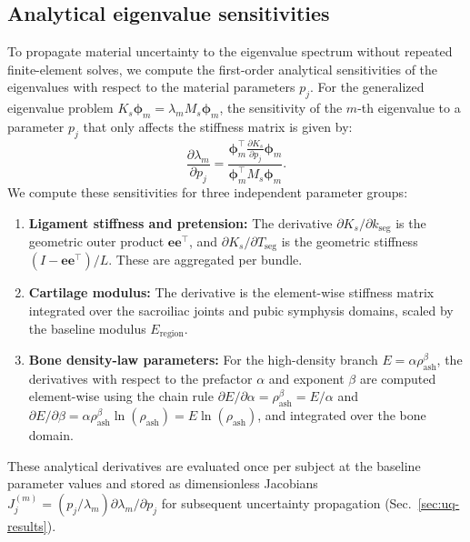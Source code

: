 \documentclass[11pt]{article}
\begin{document}
\subsection{Analytical eigenvalue sensitivities}
\label{sec:sensitivities}
To propagate material uncertainty to the eigenvalue spectrum without repeated finite-element solves, we compute the first-order analytical sensitivities of the eigenvalues with respect to the material parameters $p_j$. For the generalized eigenvalue problem $K_s \boldsymbol\phi_m = \lambda_m M_s \boldsymbol\phi_m$, the sensitivity of the $m$-th eigenvalue to a parameter $p_j$ that only affects the stiffness matrix is given by:
\begin{equation}
\frac{\partial \lambda_m}{\partial p_j} = \frac{\boldsymbol\phi_m^\top \frac{\partial K_s}{\partial p_j} \boldsymbol\phi_m}{\boldsymbol\phi_m^\top M_s \boldsymbol\phi_m}.
\end{equation}
We compute these sensitivities for three independent parameter groups:
\begin{enumerate}[leftmargin=1.8em]
\item \textbf{Ligament stiffness and pretension:} The derivative $\partial K_s / \partial k_{\text{seg}}$ is the geometric outer product $\mathbf e\mathbf e^\top$, and $\partial K_s / \partial T_{\text{seg}}$ is the geometric stiffness $(I-\mathbf e\mathbf e^\top)/L$. These are aggregated per bundle.
\item \textbf{Cartilage modulus:} The derivative is the element-wise stiffness matrix integrated over the sacroiliac joints and pubic symphysis domains, scaled by the baseline modulus $E_{\text{region}}$.
\item \textbf{Bone density-law parameters:} For the high-density branch $E = \alpha \rho_{\mathrm{ash}}^\beta$, the derivatives with respect to the prefactor $\alpha$ and exponent $\beta$ are computed element-wise using the chain rule $\partial E / \partial \alpha = \rho_{\mathrm{ash}}^\beta = E/\alpha$ and $\partial E / \partial \beta = \alpha \rho_{\mathrm{ash}}^\beta \ln(\rho_{\mathrm{ash}}) = E \ln(\rho_{\mathrm{ash}})$, and integrated over the bone domain.
\end{enumerate}
These analytical derivatives are evaluated once per subject at the baseline parameter values and stored as dimensionless Jacobians $J_j^{(m)} = (p_j / \lambda_m) \partial \lambda_m / \partial p_j$ for subsequent uncertainty propagation (Sec.~\ref{sec:uq-results}).

\end{document}
